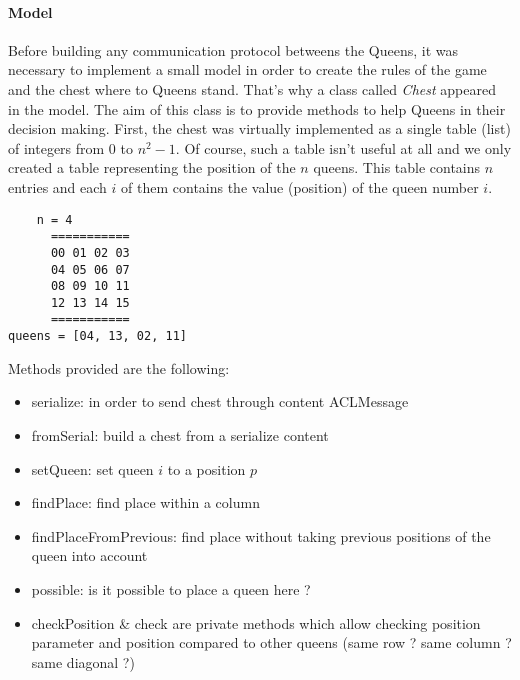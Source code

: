 \documentclass[a4paper,11pt]{article}
\begin{document}
  \paragraph{Model}
  Before building any communication protocol betweens the Queens, it was necessary to implement a 
  small model in order to create the rules of the game and the chest where to Queens stand. That's 
  why a class called \textit{Chest} appeared in the model. The aim of this class is to provide 
  methods to help Queens in their decision making. First, the chest was virtually implemented as a 
  single table (list) of integers from 0 to $n^2-1$. Of course, such a table isn't useful at all and 
  we only created a table representing the position of the $n$ queens. This table contains $n$ entries 
  and each $i$ of them contains the value (position) of the queen number $i$.
  \begin{verbatim}
	n = 4
      ===========
      00 01 02 03
      04 05 06 07
      08 09 10 11
      12 13 14 15
      ===========
queens = [04, 13, 02, 11]
  \end{verbatim}

  Methods provided are the following:
  \begin{itemize}
   \item serialize: in order to send chest through content ACLMessage
   \item fromSerial: build a chest from a serialize content
   \item setQueen: set queen $i$ to a position $p$
   \item findPlace: find place within a column
   \item findPlaceFromPrevious: find place without taking previous positions of the queen into account
   \item possible: is it possible to place a queen here ?
   \item checkPosition \& check are private methods which allow checking position parameter and position 
   compared to other queens (same row ? same column ? same diagonal ?)
  \end{itemize}
\end{document}
